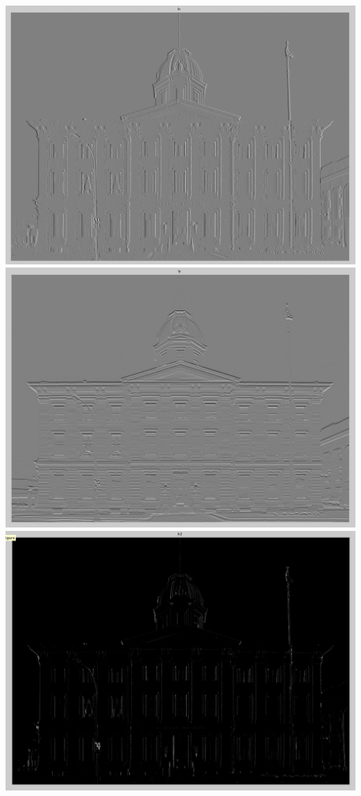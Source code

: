 \documentclass[11pt]{article}
\begin{document}
\includegraphics[scale=0.5]{lx}
\includegraphics[scale=0.5]{Iy}
\includegraphics[scale=0.5]{Ix2}
\end{document}
